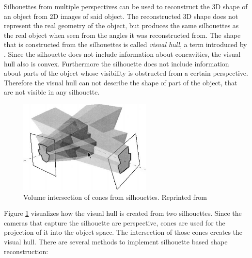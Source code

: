 Silhouettes from multiple perspectives can be used to reconstruct the \ac{3D} shape of an object from \ac{2D} images of said object.
The reconstructed \ac{3D} shape does not represent the real geometry of the object, but produces the same silhouettes as the real object when seen from the angles it was reconstructed from.
The shape that is constructed from the silhouettes is called \emph{visual hull}, a term introduced by \textcite[][]{laurentini1994hull}.
Since the silhouette does not include information about concavities,
the visual hull also is convex. 
Furthermore the silhouette does not include information about parts of the object whose visibility is obstructed from a certain perspective.
Therefore the visual hull can not describe the shape of  part of the object, that are not visible in any silhouette.

\begin{figure}[hbt]
	\centering
	\includegraphics[width=0.6\textwidth, keepaspectratio]{resources/volume_intersection_bottino}
	\caption[Volume intersection of cones from silhouettes]{\label{fig:sota:volumeintersection} Volume intersection of cones from silhouettes.
	Reprinted from \textcite[][]{bottino2001silhouette}}
\end{figure}

Figure \ref{fig:sota:volumeintersection} visualizes how the visual hull is created from two silhouettes. 
Since the cameras that capture the silhouette are perspective,
cones are used for the projection of it into the object space.
The intersection of those cones creates the visual hull.
There are several methods to implement silhouette based shape reconstruction:


